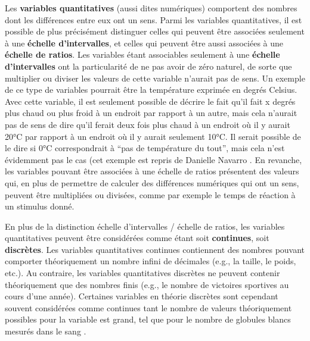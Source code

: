 \documentclass[
  french,
]{book}
\begin{document}
Les \textbf{variables quantitatives} (aussi dites numériques) comportent des nombres dont les différences entre eux ont un sens. Parmi les variables quantitatives, il est possible de plus précisément distinguer celles qui peuvent être associées seulement à une \textbf{échelle d'intervalles}, et celles qui peuvent être aussi associées à une \textbf{échelle de ratios}. Les variables étant associables seulement à une \textbf{échelle d'intervalles} ont la particularité de ne pas avoir de zéro naturel, de sorte que multiplier ou diviser les valeurs de cette variable n'aurait pas de sens. Un exemple de ce type de variables pourrait être la température exprimée en degrés Celsius. Avec cette variable, il est seulement possible de décrire le fait qu'il fait x degrés plus chaud ou plus froid à un endroit par rapport à un autre, mais cela n'aurait pas de sens de dire qu'il ferait deux fois plus chaud à un endroit où il y aurait 20°C par rapport à un endroit où il y aurait seulement 10°C. Il serait possible de le dire si 0°C correspondrait à ``pas de température du tout'', mais cela n'est évidemment pas le cas (cet exemple est repris de Danielle Navarro \autocite*{navarroLearningStatistics2018}. En revanche, les variables pouvant être associées à une échelle de ratios présentent des valeurs qui, en plus de permettre de calculer des différences numériques qui ont un sens, peuvent être multipliées ou divisées, comme par exemple le temps de réaction à un stimulus donné.

En plus de la distinction échelle d'intervalles / échelle de ratios, les variables quantitatives peuvent être considérées comme étant soit \textbf{continues}, soit \textbf{discrètes}. Les variables quantitatives continues contiennent des nombres pouvant comporter théoriquement un nombre infini de décimales (e.g., la taille, le poids, etc.). Au contraire, les variables quantitatives discrètes ne peuvent contenir théoriquement que des nombres finis (e.g., le nombre de victoires sportives au cours d'une année). Certaines variables en théorie discrètes sont cependant souvent considérées comme continues tant le nombre de valeurs théoriquement possibles pour la variable est grand, tel que pour le nombre de globules blancs mesurés dans le sang \autocite{labreucheDifferentsTypesVariables2010}.
\end{document}
